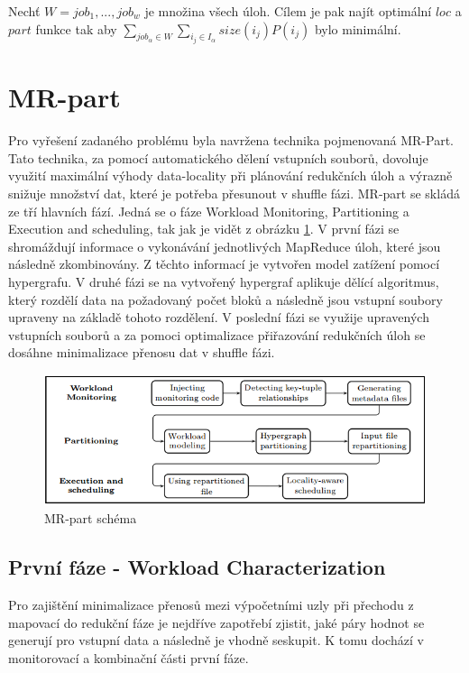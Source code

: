 \documentclass[thesis=M,czech]{FITthesis}[2012/06/26]
\begin{document}
Nechť $W = {job_1, ..., job_w}$ je množina všech úloh. Cílem je pak najít optimální $loc$ a $part$ funkce tak aby $\sum_{job_\alpha \in W} \sum_{i_j \in I_\alpha}  size(i_j)P(i_j) $ bylo minimální.

\section{MR-part}
Pro vyřešení zadaného problému byla navržena technika pojmenovaná MR-Part. Tato technika, za pomocí automatického dělení vstupních souborů, dovoluje využití maximální výhody data-locality při plánování redukčních úloh a výrazně snižuje množství dat, které je potřeba přesunout v shuffle fázi. MR-part se skládá ze tří hlavních fází. Jedná se o fáze Workload Monitoring, Partitioning a Execution and scheduling, tak jak je vidět z obrázku \ref{fig:MR-part}. V první fázi se shromáždují informace o vykonávání jednotlivých MapReduce úloh, které jsou následně zkombinovány. Z těchto informací je vytvořen model zatížení pomocí hypergrafu. V druhé fázi se na vytvořený hypergraf aplikuje dělící algoritmus, který rozdělí data na požadovaný počet bloků a následně jsou vstupní soubory upraveny na základě tohoto rozdělení. V poslední fázi se využije upravených vstupních souborů a za pomoci optimalizace přiřazování redukčních úloh se dosáhne minimalizace přenosu dat v shuffle fázi.

\begin{figure}\centering
	\includegraphics[width=1\textwidth, angle=0]{files/MR-part}
	\caption[MR-part schéma]{MR-part schéma}\label{fig:MR-part}
\end{figure}

\subsection{První fáze - Workload Characterization}
Pro zajištění minimalizace přenosů mezi výpočetními uzly při přechodu z mapovací do redukční fáze je nejdříve zapotřebí zjistit, jaké páry hodnot se generují pro vstupní data a následně je vhodně seskupit. K tomu dochází v monitorovací a kombinační části první fáze.
\end{document}

